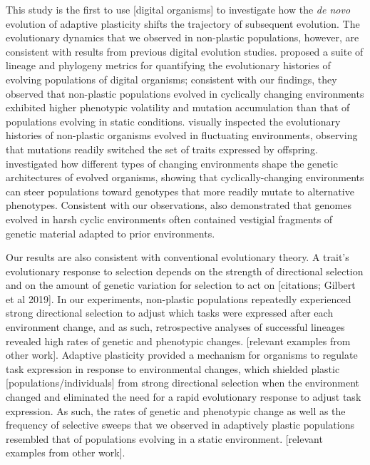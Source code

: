 This study is the first to use [digital organisms] to investigate how the \textit{de novo} evolution of adaptive plasticity shifts the trajectory of subsequent evolution.
The evolutionary dynamics that we observed in non-plastic populations, however, are consistent with results from previous digital evolution studies. %
\cite{dolson_interpreting_2020} proposed a suite of lineage and phylogeny metrics for quantifying the evolutionary histories of evolving populations of digital organisms; consistent with our findings, they observed that non-plastic populations evolved in cyclically changing environments exhibited higher phenotypic volatility and mutation accumulation than that of populations evolving in static conditions.
\cite{lalejini_evolutionary_2016} visually inspected the evolutionary histories of non-plastic organisms evolved in fluctuating environments, observing that mutations readily switched the set of traits expressed by offspring.
\cite{canino-koning_evolution_2016} investigated how different types of changing environments shape the genetic architectures of evolved organisms, showing that cyclically-changing environments can steer populations toward genotypes that more readily mutate to alternative phenotypes.
Consistent with our observations, \cite{canino-koning_evolution_2016} also demonstrated that genomes evolved in harsh cyclic environments often contained vestigial fragments of genetic material adapted to prior environments.

Our results are also consistent with conventional evolutionary theory.
A trait's evolutionary response to selection depends on the strength of directional selection and on the amount of genetic variation for selection to act on [citations; Gilbert et al 2019].
In our experiments, non-plastic populations repeatedly experienced strong directional selection to adjust which tasks were expressed after each environment change, and as such, retrospective analyses of successful lineages revealed high rates of genetic and phenotypic changes.
[relevant examples from other work].
Adaptive plasticity provided a mechanism for organisms to regulate task expression in response to environmental changes, which shielded plastic [populations/individuals] from strong directional selection when the environment changed and eliminated the need for a rapid evolutionary response to adjust task expression.
As such, the rates of genetic and phenotypic change as well as the frequency of selective sweeps that we observed in adaptively plastic populations resembled that of populations evolving in a static environment. 
[relevant examples from other work].

